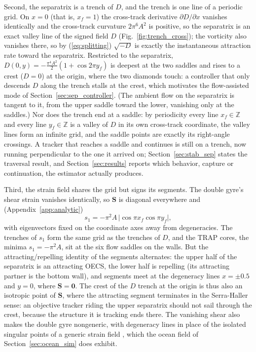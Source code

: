 \documentclass[lettersize,journal]{IEEEtran}
\begin{document}
Second, the separatrix is a trench of $D$, and the trench is one line
of a periodic grid. On $x = 0$ (that is, $x_f = 1$) the cross-track
derivative $\partial D/\partial x$ vanishes identically and the
cross-track curvature $2\pi^6 A^2$ is positive, so the separatrix is an
exact valley line of the signed field $D$
(Fig.~\ref{fig:trench_cross}); the vorticity also vanishes there, so by
(\ref{eq:splitting}) $\sqrt{-D}$ is exactly the instantaneous
attraction rate toward the separatrix. Restricted to the separatrix,
$D(0, y) = -\tfrac{\pi^4 A^2}{2}(1 + \cos 2\pi y_f)$ is deepest at the
two saddles and rises to a crest ($D = 0$) at the origin, where the two
diamonds touch: a controller that only descends $D$ along the trench
stalls at the crest, which motivates the flow-assisted mode of
Section~\ref{sec:sep_controller}. (The ambient flow on the separatrix
is tangent to it, from the upper saddle toward the lower, vanishing
only at the saddles.) Nor does the trench end at a saddle: by
periodicity every line $x_f \in \mathbb{Z}$ and every line $y_f \in
\mathbb{Z}$ is a valley of $D$ in its own cross-track coordinate, the
valley lines form an infinite grid, and the saddle points are exactly
its right-angle crossings. A tracker that reaches a saddle and
continues is still on a trench, now running perpendicular to the one it
arrived on; Section~\ref{sec:stab_sep} states the traversal result, and
Section~\ref{sec:results} reports which behavior, capture or
continuation, the estimator actually produces.

Third, the strain field shares the grid but signs its segments. The
double gyre's shear strain vanishes identically, so $\mathbf{S}$ is
diagonal everywhere and (Appendix~\ref{app:analytic})
\begin{equation}
    s_1 = -\pi^2 A\,\lvert\cos \pi x_f \cos \pi y_f\rvert,
    \label{eq:s1_analytic_main}
\end{equation}
with eigenvectors fixed on the coordinate axes away from degeneracies.
The trenches of $s_1$ form the same grid as the trenches of $D$, and
the TRAP cores, the minima $s_1 = -\pi^2 A$, sit at the six flow
saddles on the walls. But the attracting/repelling identity of the
segments alternates: the upper half of the separatrix is an attracting
OECS, the lower half is repelling (its attracting partner is the bottom
wall), and segments meet at the degeneracy lines $x = \pm 0.5$ and $y =
0$, where $\mathbf{S} = \mathbf{0}$. The crest of the $D$ trench at the
origin is thus also an isotropic point of $\mathbf{S}$, where the
attracting segment terminates in the Serra-Haller sense: an objective
tracker riding the upper separatrix should not sail through the crest,
because the structure it is tracking ends there. The vanishing shear
also makes the double gyre nongeneric, with degeneracy lines in place
of the isolated singular points of a generic strain field \cite{17},
which the ocean field of Section~\ref{sec:ocean_sim} does exhibit.
\end{document}
